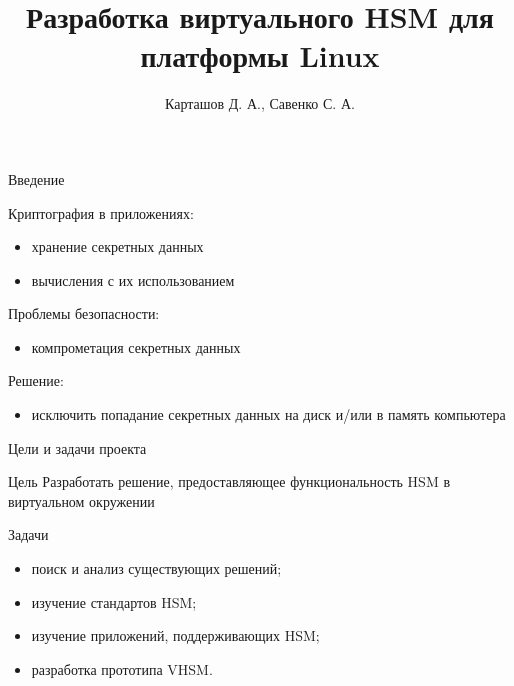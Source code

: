 \documentclass[utf8, 11pt]{beamer}
\author[ ]{Карташов Д. А., Савенко С. А.}
\title[Virtual HSM]{Разработка виртуального HSM для платформы Linux}
\institute[ ]
{
  Parallels Lab SPbAU
}
\date{ }
\begin{document}
\begin{frame}
  \titlepage
\end{frame}

\begin{frame}{Введение}

Криптография в приложениях:
\begin{itemize}
\item хранение секретных данных
\item вычисления с их использованием
\end{itemize}

\vspace*{\fill}

Проблемы безопасности:
\begin{itemize}
\item компрометация секретных данных
\end{itemize}

\vspace*{\fill}

Решение:
\begin{itemize}
\item исключить попадание секретных данных на диск и/или в память компьютера
\end{itemize}

\vspace*{\fill}

\end{frame}

\begin{frame}{Цели и задачи проекта}

\begin{block}{Цель}
Разработать решение, предоставляющее функциональность HSM в виртуальном окружении
\end{block}

\vspace*{\fill}

\begin{block}{Задачи}
\begin{itemize}
\item поиск и анализ существующих решений;
\item изучение стандартов HSM;
\item изучение приложений, поддерживающих HSM;
\item разработка прототипа VHSM.
\end{itemize}
\end{block}

\end{frame}
\end{document}
